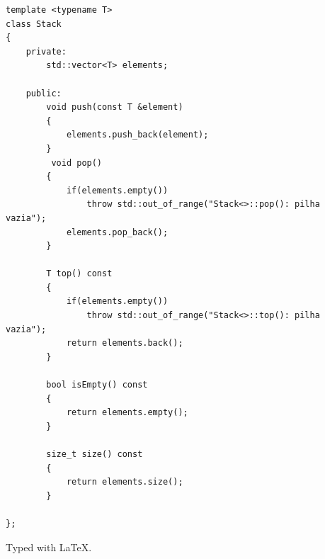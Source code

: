 \documentclass[twocolumn,a4paper,12pt]{article}
\begin{document}
\begin{minipage}{\linewidth}
\begin{lstlisting}[caption={Implementação da classe \texttt{Stack}}, label={lst:stack}]
template <typename T>
class Stack
{
    private:
        std::vector<T> elements;

    public:
        void push(const T &element)
        {
            elements.push_back(element);
        }
         void pop()
        {
            if(elements.empty())
                throw std::out_of_range("Stack<>::pop(): pilha vazia");
            elements.pop_back();
        }

        T top() const
        {
            if(elements.empty())
                throw std::out_of_range("Stack<>::top(): pilha vazia");
            return elements.back();
        }

        bool isEmpty() const
        {
            return elements.empty();
        }

        size_t size() const
        {
            return elements.size();
        }

};

\end{lstlisting}
\end{minipage}

%



\vfill

Typed with \LaTeX.
\end{document}
